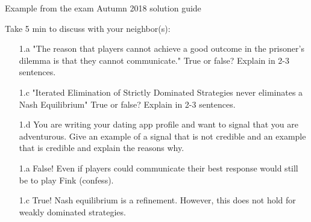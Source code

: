 \begin{frame}{Example from the exam Autumn 2018 solution guide}
\begin{multicols}{2}\color{lightgray}
  Take 5 min to discuss with your neighbor(s):
  \begin{itemize}\color{lightgray}
    \item[\color{lightgray}1.a] "The reason that players cannot achieve a good outcome in the prisoner’s dilemma is that they cannot communicate." True or false? Explain in 2-3 sentences.
    \item[1.c] \color{black}"Iterated Elimination of Strictly Dominated Strategies never eliminates a Nash Equilibrium" True or false? Explain in 2-3 sentences.
    \item[\color{lightgray}1.d] \color{lightgray}You are writing your dating app profile and want to signal that you are adventurous. Give an example of a signal that is not credible and an example that is credible and explain the reasons why.
  \end{itemize}
\vfill\null
\columnbreak
\begin{itemize}\color{lightgray}
  \item[\color{lightgray}1.a] False! Even if players could communicate their best response would still be to play Fink (confess).
  \item[1.c] \color{black}True! Nash equilibrium is a refinement. However, this does not hold for weakly dominated strategies.
\end{itemize}
\end{multicols}
\end{frame}

